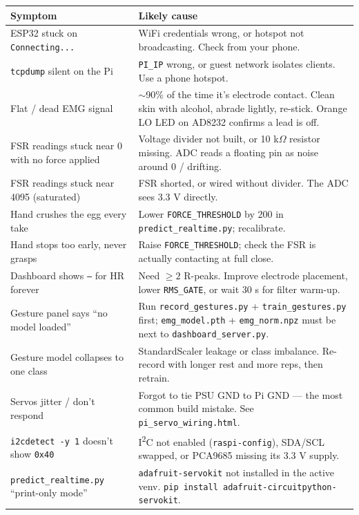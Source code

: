 \documentclass[10pt, a4paper]{article}
\begin{document}
\begin{tabularx}{\linewidth}{p{5.5cm}X}
\toprule
\textbf{Symptom} & \textbf{Likely cause} \\
\midrule
ESP32 stuck on \texttt{Connecting...} & WiFi credentials wrong, or hotspot not broadcasting. Check from your phone. \\
\addlinespace
\texttt{tcpdump} silent on the Pi & \texttt{PI\_IP} wrong, or guest network isolates clients. Use a phone hotspot. \\
\addlinespace
Flat / dead EMG signal & $\sim$90\% of the time it's electrode contact. Clean skin with alcohol, abrade lightly, re-stick. Orange LO LED on AD8232 confirms a lead is off. \\
\addlinespace
FSR readings stuck near 0 with no force applied & Voltage divider not built, or 10 k$\Omega$ resistor missing. ADC reads a floating pin as noise around 0 / drifting. \\
\addlinespace
FSR readings stuck near 4095 (saturated) & FSR shorted, or wired without divider. The ADC sees 3.3 V directly. \\
\addlinespace
Hand crushes the egg every take & Lower \texttt{FORCE\_THRESHOLD} by 200 in \texttt{predict\_realtime.py}; recalibrate. \\
\addlinespace
Hand stops too early, never grasps & Raise \texttt{FORCE\_THRESHOLD}; check the FSR is actually contacting at full close. \\
\addlinespace
Dashboard shows \texttt{--} for HR forever & Need $\geq 2$ R-peaks. Improve electrode placement, lower \texttt{RMS\_GATE}, or wait 30 s for filter warm-up. \\
\addlinespace
Gesture panel says ``no model loaded'' & Run \texttt{record\_gestures.py} + \texttt{train\_gestures.py} first; \texttt{emg\_model.pth} + \texttt{emg\_norm.npz} must be next to \texttt{dashboard\_server.py}. \\
\addlinespace
Gesture model collapses to one class & StandardScaler leakage or class imbalance. Re-record with longer rest and more reps, then retrain. \\
\addlinespace
Servos jitter / don't respond & Forgot to tie PSU GND to Pi GND --- the most common build mistake. See \texttt{pi\_servo\_wiring.html}. \\
\addlinespace
\texttt{i2cdetect -y 1} doesn't show \texttt{0x40} & I\textsuperscript{2}C not enabled (\texttt{raspi-config}), SDA/SCL swapped, or PCA9685 missing its 3.3 V supply. \\
\addlinespace
\texttt{predict\_realtime.py} ``print-only mode'' & \texttt{adafruit-servokit} not installed in the active venv. \texttt{pip install adafruit-circuitpython-servokit}. \\
\bottomrule
\end{tabularx}
\end{document}
